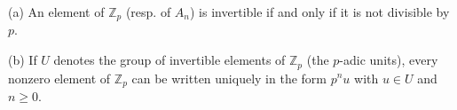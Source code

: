 (a) An element of $\mathbb{Z}_p$ (resp. of $A_n$) is invertible if and only if it is not divisible by $p$.

(b) If $U$ denotes the group of invertible elements of $\mathbb{Z}_p$ (the $p$-adic units), every nonzero element of $\mathbb{Z}_p$ can be written uniquely in the form $p^n u$ with $u \in U$ and $n \geq 0$.
